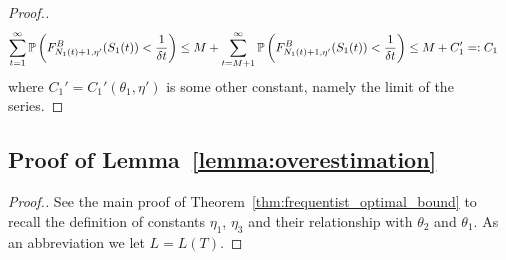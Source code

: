\begin{proof}[Proof.]
	\begin{align*}
	\sum_{t=1}^\infty \P{F^B_{N_1(t)+1, \eta'}(S_1(t)) < \frac{1}{\delta t}} & \le M +  \sum_{t=M+1}^\infty \P{F^B_{N_1(t)+1, \eta'}(S_1(t)) < \frac{1}{\delta t}} \le M +  C_1' =: C_1
	\end{align*}
	where $C_1' = C_1'(\theta_1, \eta')$ is some other constant, namely the limit of the series.
\end{proof}

\subsection{Proof of Lemma~\ref{lemma:overestimation}} \label{proof:overestimation_proof}

\begin{proof}[Proof.]
	See the main proof of Theorem~\ref{thm:frequentist_optimal_bound} to recall the definition of constants $\eta_1$, $\eta_3$ and their relationship with $\theta_2$ and $\theta_1$. As an abbreviation we let $L = L(T)$. 
	

\end{proof}
